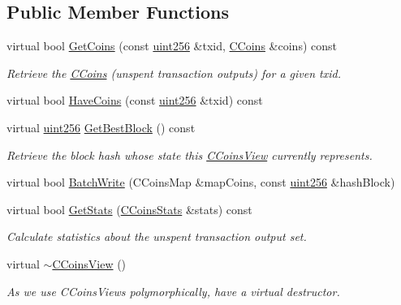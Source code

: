 \subsection*{Public Member Functions}
\begin{DoxyCompactItemize}
\item 
\mbox{\label{class_c_coins_view_a67d865358127bef1f0011a23d5158a9f}} 
virtual bool \mbox{\hyperlink{class_c_coins_view_a67d865358127bef1f0011a23d5158a9f}{Get\+Coins}} (const \mbox{\hyperlink{classuint256}{uint256}} \&txid, \mbox{\hyperlink{class_c_coins}{C\+Coins}} \&coins) const
\begin{DoxyCompactList}\small\item\em Retrieve the \mbox{\hyperlink{class_c_coins}{C\+Coins}} (unspent transaction outputs) for a given txid. \end{DoxyCompactList}\item 
virtual bool \mbox{\hyperlink{class_c_coins_view_ade3a65fc3f1b02baf7bebce630e4eba3}{Have\+Coins}} (const \mbox{\hyperlink{classuint256}{uint256}} \&txid) const
\item 
\mbox{\label{class_c_coins_view_af81f2907d360a2548d59a61388e5e5cb}} 
virtual \mbox{\hyperlink{classuint256}{uint256}} \mbox{\hyperlink{class_c_coins_view_af81f2907d360a2548d59a61388e5e5cb}{Get\+Best\+Block}} () const
\begin{DoxyCompactList}\small\item\em Retrieve the block hash whose state this \mbox{\hyperlink{class_c_coins_view}{C\+Coins\+View}} currently represents. \end{DoxyCompactList}\item 
virtual bool \mbox{\hyperlink{class_c_coins_view_ad7dc37396ca4fac7014cea06fec7178e}{Batch\+Write}} (C\+Coins\+Map \&map\+Coins, const \mbox{\hyperlink{classuint256}{uint256}} \&hash\+Block)
\item 
\mbox{\label{class_c_coins_view_adbd7f73ba071c6e441dd88d95b8f2c0d}} 
virtual bool \mbox{\hyperlink{class_c_coins_view_adbd7f73ba071c6e441dd88d95b8f2c0d}{Get\+Stats}} (\mbox{\hyperlink{struct_c_coins_stats}{C\+Coins\+Stats}} \&stats) const
\begin{DoxyCompactList}\small\item\em Calculate statistics about the unspent transaction output set. \end{DoxyCompactList}\item 
\mbox{\label{class_c_coins_view_a7ffb4218bf991ddff47339e44c8710da}} 
virtual \mbox{\hyperlink{class_c_coins_view_a7ffb4218bf991ddff47339e44c8710da}{$\sim$\+C\+Coins\+View}} ()
\begin{DoxyCompactList}\small\item\em As we use C\+Coins\+Views polymorphically, have a virtual destructor. \end{DoxyCompactList}\end{DoxyCompactItemize}



